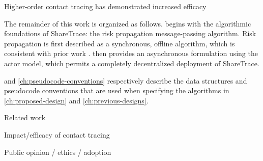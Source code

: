 
Higher-order contact tracing has demonstrated increased efficacy \citep{PozoMartin2023}




The remainder of this work is organized as follows.  begins with the algorithmic foundations of ShareTrace: the risk propagation message-passing algorithm. Risk propagation is first described as a synchronous, offline algorithm, which is consistent with prior work \citep{Ayday2020, Ayday2021}.  then provides an asynchronous formulation using the actor model, which permits a completely decentralized deployment of ShareTrace.

 and \cref{ch:pseudocode-conventions} respectively describe the data structures and pseudocode conventions that are used when specifying the algorithms in \cref{ch:proposed-design} and \cref{ch:previous-designs}.

%
%

Related work \citep{Reichert2020, Cho2020, Cherini2023, Gupta2023}

Impact/efficacy of contact tracing \citep{PozoMartin2023}

Public opinion / ethics / adoption \citep{Oyibo2022, Afroogh2022, Simko2022}